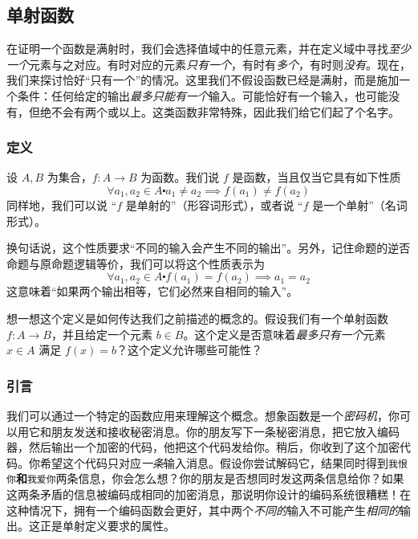 
\subsection{单射函数}

在证明一个函数是满射时，我们会选择值域中的任意元素，并在定义域中寻找\emph{至少一个}元素与之对应。有时对应的元素\emph{只有一个}，有时有\emph{多个}，有时则\emph{没有}。现在，我们来探讨恰好``只有一个''的情况。这里我们不假设函数已经是满射，而是施加一个条件：任何给定的输出\emph{最多只能有一个}输入。可能恰好有一个输入，也可能没有，但绝不会有两个或以上。这类函数非常特殊，因此我们给它们起了个名字。

\subsubsection*{定义}

\begin{definition}
    设 $A, B$ 为集合，$f: A \to B$ 为函数。我们说 $f$ 是函数，当且仅当它具有如下性质
    \[\forall a_1, a_2 \in A \centerdot a_1 \ne a_2 \implies f(a_1) \ne f(a_2)\]
    同样地，我们可以说 ``$f$ 是单射的''（形容词形式），或者说 ``$f$ 是一个单射''（名词形式）。

    换句话说，这个性质要求``不同的输入会产生不同的输出''。另外，记住命题的逆否命题与原命题逻辑等价，我们可以将这个性质表示为
    \[\forall a_1, a_2 \in A \centerdot f(a_1) = f(a_2) \implies a_1 = a_2\]
    这意味着``如果两个输出相等，它们必然来自相同的输入''。
\end{definition}

想一想这个定义是如何传达我们之前描述的概念的。假设我们有一个单射函数 $f : A \to B$，并且给定一个元素 $b \in B$。这个定义是否意味着\emph{最多只有一个}元素 $x \in A$ 满足 $f(x) = b$？这个定义允许哪些可能性？

\subsubsection*{引言}

我们可以通过一个特定的函数应用来理解这个概念。想象函数是一个\emph{密码机}，你可以用它和朋友发送和接收秘密消息。你的朋友写下一条秘密消息，把它放入编码器，然后输出一个加密的代码，他把这个代码发给你。稍后，你收到了这个加密代码。你希望这个代码只对应\emph{一条}输入消息。假设你尝试解码它，结果同时得到\verb|我恨你|\textbf{和}\verb|我爱你|两条信息，你会怎么想？你的朋友是否想同时发这两条信息给你？如果这两条矛盾的信息被编码成相同的加密消息，那说明你设计的编码系统很糟糕！在这种情况下，拥有一个编码函数会更好，其中两个\emph{不同的}输入不可能产生\emph{相同的}输出。这正是单射定义要求的属性。

